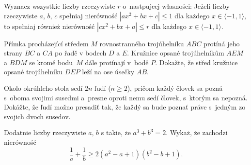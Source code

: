{%
Wyznacz wszystkie liczby rzeczywiste $r$ o~nast\ę{}puj\ą{}cej w\l{}asności: Jeżeli liczby rzeczywiste $a$, $b$, $c$ spe\l{}niaj\ą{} nierówność $|ax^2+bx+c|\le 1$ dla każdego $x\in\langle-1,1\rangle$, to spe\l{}niaj\ą{} również nierówność $|cx^2+bx+a|\leq r$ dla każdego $x\in\langle-1,1\rangle$.
}

{%
Přímka procházející středem $M$ rovnostranného trojúhelníku $ABC$ protíná jeho strany $BC$ a $CA$ po řadě v bodech $D$ a $E$. Kružnice opsané trojúhelníkům $AEM$ a $BDM$ se kromě bodu~$M$ dále protínají v~bodě $P$. Dokažte, že střed kružnice opsané trojúhelníku $DEP$ leží na ose úsečky $AB$.
}

{%
Okolo okrúhleho stola sedí $2n$ ľudí ($n\ge2$), pričom každý človek sa pozná s~oboma svojimi susedmi a~presne oproti nemu sedí človek, s~ktorým sa nepozná. Dokážte, že ľudí možno presadiť tak, že každý sa bude poznať práve s~jedným zo svojich dvoch susedov.
}

{%
Dodatnie liczby rzeczywiste $a$, $b$ s\ą{} takie, że $a^3+b^3=2$. Wykaż, że zachodzi nierówność
$$
\frac1a+\frac1b\ge 2(a^2-a+1)(b^2-b+1).
$$
}
